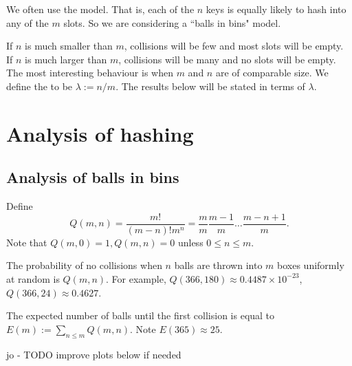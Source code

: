 We often use the  model. That is, each of 
the $n$ keys is equally likely to hash into any of the $m$ slots. So we are 
considering a ``balls in bins" model.

If $n$ is much smaller than $m$, collisions will be few and most slots 
will be empty. If $n$ is much larger than $m$, collisions will be many and no 
slots will be empty. The most interesting behaviour is when $m$ and $n$ are 
of comparable size. We define the  to be $\lambda := n/m$. The results below 
will be stated in terms of $\lambda$.


\chapter{Analysis of hashing} %

\section*{Analysis of balls in bins}
Define 
$$Q(m, n) = \frac{m!}{(m-n)! m^n} = \frac{m}{m} \frac{m-1}{m} \dots 
\frac{m - n + 1}{m}.$$
Note that $Q(m,0) = 1, Q(m, n) = 0$ unless $0 \leq n \leq m$.

The probability of no collisions when $n$ balls are thrown into $m$ boxes 
uniformly at random is $Q(m, n)$. For example, $Q(366, 180) \approx 0.4487
 \times 10^{-23}$, $Q(366, 24) \approx  0.4627$. 

The expected number of balls until the first collision is equal to 
$E(m):=\sum_{n \leq m} Q(m, n)$. Note $E(365) \approx 25$.

jo - TODO improve plots below if needed

